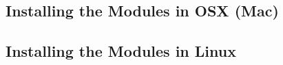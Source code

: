%
%
%
%
%
%
%
%
%
%
% 
%
%
%


%
%
%
%





\subsection{Installing the Modules in OSX (Mac)}

\subsection{Installing the Modules in Linux}

